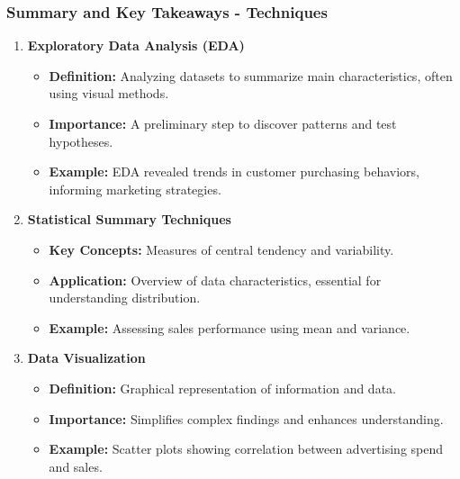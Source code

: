 \documentclass[aspectratio=169]{beamer}
\begin{document}
\begin{frame}[fragile]
    \frametitle{Summary and Key Takeaways - Techniques}
    \begin{enumerate}
        \item \textbf{Exploratory Data Analysis (EDA)}
            \begin{itemize}
                \item \textbf{Definition:} Analyzing datasets to summarize main characteristics, often using visual methods.
                \item \textbf{Importance:} A preliminary step to discover patterns and test hypotheses.
                \item \textbf{Example:} EDA revealed trends in customer purchasing behaviors, informing marketing strategies.
            \end{itemize}

        \item \textbf{Statistical Summary Techniques}
            \begin{itemize}
                \item \textbf{Key Concepts:} Measures of central tendency and variability.
                \item \textbf{Application:} Overview of data characteristics, essential for understanding distribution.
                \item \textbf{Example:} Assessing sales performance using mean and variance.
            \end{itemize}

        \item \textbf{Data Visualization}
            \begin{itemize}
                \item \textbf{Definition:} Graphical representation of information and data.
                \item \textbf{Importance:} Simplifies complex findings and enhances understanding.
                \item \textbf{Example:} Scatter plots showing correlation between advertising spend and sales.
            \end{itemize}
    \end{enumerate}
\end{frame}
\end{document}
